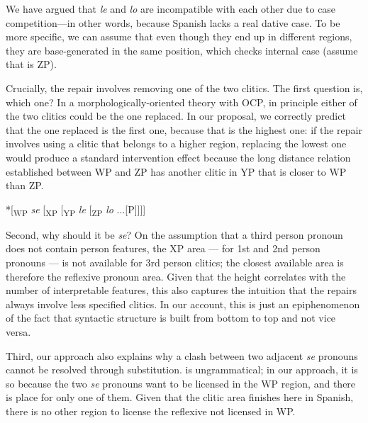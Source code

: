 \documentclass[output=paper,modfonts,nonflat,newtxmath,colorlinks,citecolor=brown]{langsci/langscibook}
\begin{document}
    \label{ex:cabre:23}
    \z



We have argued that \textit{le} and \textit{lo} are incompatible with each other due to case competition—in other words, because Spanish lacks a real dative case. To be more specific, we can assume that even though they end up in different regions, they are base-generated in the same position, which checks internal case (assume that is ZP).

Crucially, the repair involves removing one of the two clitics. The first question is, which one? In a morphologically-oriented theory with OCP, in principle either of the two clitics could be the one replaced. In our proposal, we correctly predict that the one replaced is the first one, because that is the highest one: if the repair involves using a clitic that belongs to a higher region, replacing the lowest one would produce a standard intervention effect because the long distance relation established between WP and ZP has another clitic in YP that is closer to WP than ZP.

\ea%
    \label{ex:cabre:24}
    *[\textsubscript{WP}   \textit{se}  [\textsubscript{XP}  [\textsubscript{YP}  \textit{le}  [\textsubscript{ZP}  \textit{lo} ...[{\liv}P]]]]

    \z


Second, why should it be \textit{se}? On the assumption that a third person pronoun does not contain person features, the XP area — for 1st and 2nd person pronouns — is not available for 3rd person clitics; the closest available area is therefore the reflexive pronoun area. Given that the height correlates with the number of interpretable features, this also captures the intuition that the repairs always involve less specified clitics. In our account, this is just an epiphenomenon of the fact that syntactic structure is built from bottom to top and not vice versa.

Third, our approach also explains why a clash between two adjacent \textit{se} pronouns cannot be resolved through substitution.  is ungrammatical; in our approach, it is so because the two \textit{se} pronouns want to be licensed in the WP region, and there is place for only one of them. Given that the clitic area finishes here in Spanish, there is no other region to license the reflexive not licensed in WP.

    \z
\end{document}
